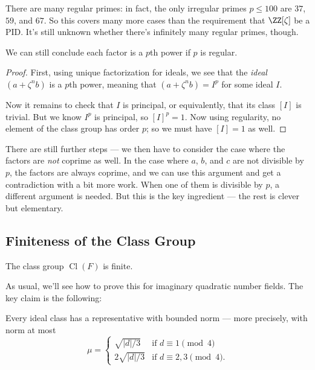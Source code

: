 There are many regular primes: in fact, the only irregular primes $p \leq 100$ are $37$, $59$, and $67$. So this covers many more cases than the requirement that $\ZZ[\zeta]$ be a PID. It's still unknown whether there's infinitely many regular primes, though.

\begin{proposition}
    We can still conclude each factor is a $p$th power if $p$ is regular. 
\end{proposition}

\begin{proof}
    First, using unique factorization for ideals, we see that the \emph{ideal} $(a + \zeta^nb)$ is a $p$th power, meaning that $(a + \zeta^nb) = I^p$ for some ideal $I$. 
    
    Now it remains to check that $I$ is principal, or equivalently, that its class $[I]$ is trivial. But we know $I^p$ is principal, so $[I]^p = 1$. Now using regularity, no element of the class group has order $p$; so we must have $[I] = 1$ as well. 
\end{proof}

There are still further steps --- we then have to consider the case where the factors are \emph{not} coprime as well. In the case where $a$, $b$, and $c$ are not divisible by $p$, the factors are always coprime, and we can use this argument and get a contradiction with a bit more work. When one of them is divisible by $p$, a different argument is needed. But this is the key ingredient --- the rest is clever but elementary. 

\subsection{Finiteness of the Class Group}

\vspace{0.75em}

\begin{theorem}
The class group $\operatorname{Cl}(F)$ is finite. 
\end{theorem}

As usual, we'll see how to prove this for imaginary quadratic number fields. The key claim is the following:

\begin{proposition}\label{boundednorm}
    Every ideal class has a representative with bounded norm --- more precisely, with norm at most \[\mu = \begin{cases} \sqrt{|d|/3} & \text{if } d \equiv 1 \pmod{4} \\ 2\sqrt{|d|/3} & \text{if } d \equiv 2, 3 \pmod{4}.\end{cases}\] 
\end{proposition}

